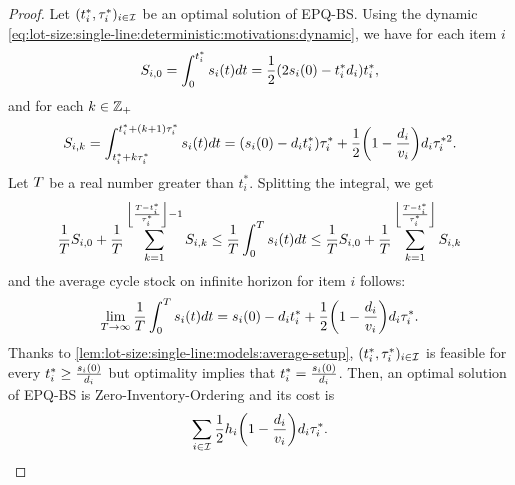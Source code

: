 \begin{proof}
Let $\bracket{t_i^*,\cover_i^*}_{i\in\REF}$ be an optimal solution of EPQ-BS.
Using the dynamic \eqref{eq:lot-size:single-line:deterministic:motivations:dynamic}, we have for each item $i$
\begin{equation}
  S_{i,0}
  =
  \int_0^{t_i^*}\inventory_i\bracket{t}dt
  = \frac{1}{2}\bracket{2\inventory_i\bracket{0}-t_i^*\demand_i}t_i^*,
\end{equation}
and for each $k\in\mathbb{Z}_+$
\begin{equation}
  S_{i,k}
  =
  \int_{t_i^*+k\cover_i^*}^{t_i^*+\bracket{k+1}\cover_i^*}\inventory_i(t)dt
  =
  \bracket{\inventory_i(0)-\demand_i t_i^*}\cover_i^*
  + \frac{1}{2}\bracket{1-\frac{\demand_i}{\rate_i}}\demand_i\cover_i^{*2}.
\end{equation}
Let $T$ be a real number greater than $t_i^*$.
Splitting the integral, we get
\begin{equation}
  \frac{1}{\horizon} S_{i,0}
  + \frac{1}{\horizon} \sum_{k=1}^{\left\lfloor\frac{\horizon-t_i^*}{\cover_i^*}\right\rfloor-1} S_{i,k}
  \le
  \frac{1}{\horizon} \int_0^{\horizon}\inventory_i\bracket{t}dt
  \le
  \frac{1}{\horizon} S_{i,0}
  + \frac{1}{\horizon} \sum_{k=1}^{\left\lfloor\frac{\horizon-t_i^*}{\cover_i^*}\right\rfloor} S_{i,k}
\end{equation}
and the average cycle stock on infinite horizon for item $i$ follows:
\begin{equation}
  \lim_{\horizon\rightarrow\infty} \frac{1}{\horizon} \int_0^{\horizon}\inventory_i\bracket{t}dt
  =
  \inventory_i(0)-\demand_i t_i^*
  + \frac{1}{2}\bracket{1-\frac{\demand_i}{\rate_i}}\demand_i\cover_i^*.
\end{equation}
Thanks to \cref{lem:lot-size:single-line:models:average-setup}, $\bracket{t_i^*,\cover_i^*}_{i\in\REF}$ is feasible for every $t_i^*\ge\frac{s_i(0)}{d_i}$ but optimality implies that $t_i^*=\frac{s_i(0)}{d_i}$. Then, an optimal solution of EPQ-BS is Zero-Inventory-Ordering and its cost is
\begin{equation}
  \sum_{i\in\REF}\frac{1}{2}\holding_i\bracket{1-\frac{\demand_i}{\rate_i}}\demand_i\cover_i^*.
\end{equation}
\end{proof}





